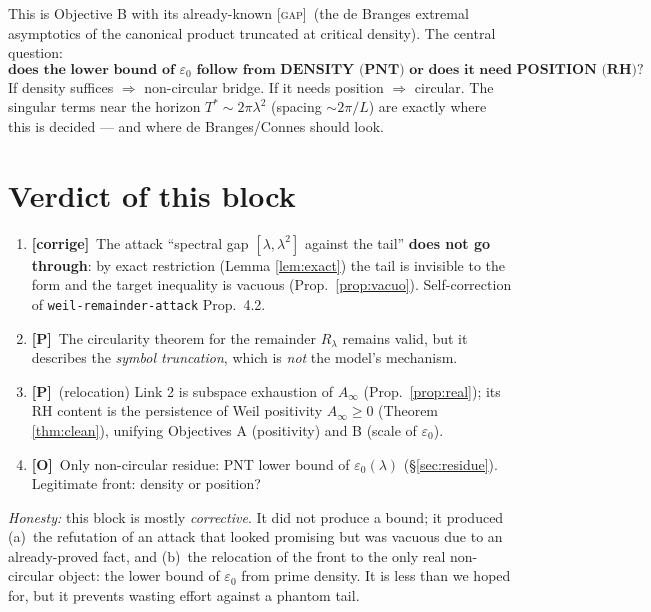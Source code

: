 \documentclass[11pt]{article}
\newcommand{\PR}{\textcolor{green!55!black}{\textbf{[P]}}}
\newcommand{\OP}{\textcolor{red!75!black}{\textbf{[O]}}}
\newcommand{\GAP}{\textcolor{red!75!black}{\textsc{[gap]}}}
\newcommand{\RETRACT}{\textcolor{orange!85!black}{\textbf{[corrige]}}}
\theoremstyle{plain}
\theoremstyle{definition}
\begin{document}
\noindent This is Objective B with its already-known \GAP\ (the de Branges
extremal asymptotics of the canonical product truncated at critical density). The
central question:
\[
  \textbf{does the lower bound of }\varepsilon_0\textbf{ follow from DENSITY (PNT)
  or does it need POSITION (RH)?}
\]
If density suffices $\Rightarrow$ non-circular bridge. If it needs position
$\Rightarrow$ circular. The singular terms near the horizon $T^*\sim2\pi\lambda^2$
(spacing $\sim2\pi/L$) are exactly where this is decided --- and where de
Branges/Connes should look.

\section{Verdict of this block}\label{sec:verdict}

\begin{enumerate}[leftmargin=1.6em]
\item \RETRACT\ The attack ``spectral gap $[\lambda,\lambda^2]$ against the tail''
\textbf{does not go through}: by exact restriction (Lemma \ref{lem:exact}) the
tail is invisible to the form and the target inequality is vacuous (Prop.\
\ref{prop:vacuo}). Self-correction of \texttt{weil-remainder-attack} Prop.\ 4.2.
\item \PR\ The circularity theorem for the remainder $R_\lambda$ remains valid,
but it describes the \emph{symbol truncation}, which is \emph{not} the model's
mechanism.
\item \PR\ (relocation) Link 2 is subspace exhaustion of $A_\infty$ (Prop.\
\ref{prop:real}); its RH content is the persistence of Weil positivity
$A_\infty\ge0$ (Theorem \ref{thm:clean}), unifying Objectives A (positivity) and B
(scale of $\varepsilon_0$).
\item \OP\ Only non-circular residue: PNT lower bound of $\varepsilon_0(\lambda)$
(\S\ref{sec:residue}). Legitimate front: density or position?
\end{enumerate}

\noindent\emph{Honesty:} this block is mostly \emph{corrective}. It did not
produce a bound; it produced (a)~the refutation of an attack that looked
promising but was vacuous due to an already-proved fact, and (b)~the relocation
of the front to the only real non-circular object: the lower bound of
$\varepsilon_0$ from prime density. It is less than we hoped for, but it prevents
wasting effort against a phantom tail.
\end{document}
